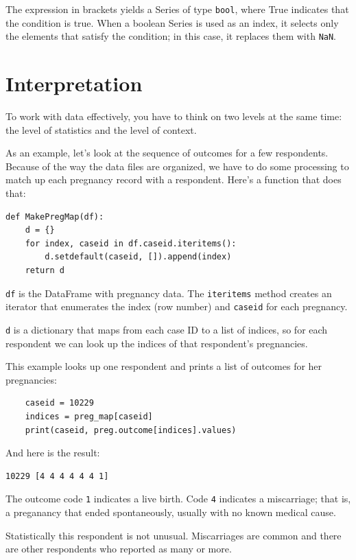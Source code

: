 \documentclass[12pt]{book}
\begin{document}
The expression in brackets yields a Series of type {\tt bool}, 
where True indicates that the condition is true.  When a boolean
Series is used as an index, it selects only the elements that
satisfy the condition; in this case, it replaces them with {\tt NaN}.


\section{Interpretation}

To work with data effectively, you have to think on two levels at the
same time: the level of statistics and the level of context.

As an example, let's look at the sequence of outcomes for a few
respondents.  Because of the way the data files are organized, we have
to do some processing to match up each pregnancy record with a respondent.
Here's a function that does that:

\begin{verbatim}
def MakePregMap(df):
    d = {}
    for index, caseid in df.caseid.iteritems():
        d.setdefault(caseid, []).append(index)
    return d
\end{verbatim}

{\tt df} is the DataFrame with pregnancy data.  The {\tt iteritems}
method creates an iterator that enumerates the index (row number)
and {\tt caseid} for each pregnancy.

{\tt d} is a dictionary that maps from each case ID to a list of
indices, so for each respondent we can look up the indices of
that respondent's pregnancies.

This example looks up one respondent and prints a list of outcomes
for her pregnancies:

\begin{verbatim}
    caseid = 10229
    indices = preg_map[caseid]
    print(caseid, preg.outcome[indices].values)
\end{verbatim}

And here is the result:

\begin{verbatim}
10229 [4 4 4 4 4 4 1]
\end{verbatim}

The outcome code {\tt 1} indicates a live birth. Code {\tt 4} indicates
a miscarriage; that is, a preganancy that ended spontaneously, usually
with no known medical cause.

Statistically this respondent is not unusual.  Miscarriages are common
and there are other respondents who reported as many or more.
\end{document}
